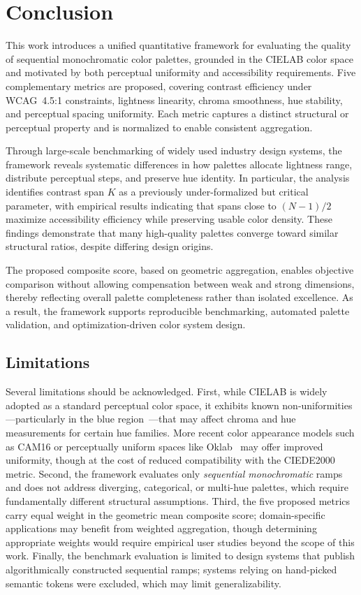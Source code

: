 \section{Conclusion}

This work introduces a unified quantitative framework for evaluating the
quality of sequential monochromatic color palettes, grounded in the CIELAB
color space and motivated by both perceptual uniformity and accessibility
requirements. Five complementary metrics are proposed, covering contrast
efficiency under WCAG~4.5:1 constraints, lightness linearity, chroma
smoothness, hue stability, and perceptual spacing uniformity. Each metric
captures a distinct structural or perceptual property and is normalized to
enable consistent aggregation.

Through large-scale benchmarking of widely used industry design systems, the
framework reveals systematic differences in how palettes allocate lightness
range, distribute perceptual steps, and preserve hue identity. In particular,
the analysis identifies contrast span $K$ as a previously under-formalized
but critical parameter, with empirical results indicating that spans close to
$(N-1)/2$ maximize accessibility efficiency while preserving usable color
density. These findings demonstrate that many high-quality palettes converge
toward similar structural ratios, despite differing design origins.

The proposed composite score, based on geometric aggregation, enables
objective comparison without allowing compensation between weak and strong
dimensions, thereby reflecting overall palette completeness rather than
isolated excellence. As a result, the framework supports reproducible
benchmarking, automated palette validation, and optimization-driven color
system design.

\subsection{Limitations}

Several limitations should be acknowledged.
First, while CIELAB is widely adopted as a standard perceptual color space,
it exhibits known non-uniformities---particularly in the blue
region~\cite{luo2001}---that may affect chroma and hue measurements for
certain hue families. More recent color appearance models such as
CAM16 or perceptually uniform spaces like Oklab~\cite{safdar2017} may offer
improved uniformity, though at the cost of reduced compatibility with the
CIEDE2000 metric.
Second, the framework evaluates only \emph{sequential monochromatic} ramps
and does not address diverging, categorical, or multi-hue palettes, which
require fundamentally different structural assumptions.
Third, the five proposed metrics carry equal weight in the geometric mean
composite score; domain-specific applications may benefit from weighted
aggregation, though determining appropriate weights would require empirical
user studies beyond the scope of this work.
Finally, the benchmark evaluation is limited to design systems that publish
algorithmically constructed sequential ramps; systems relying on hand-picked
semantic tokens were excluded, which may limit generalizability.

